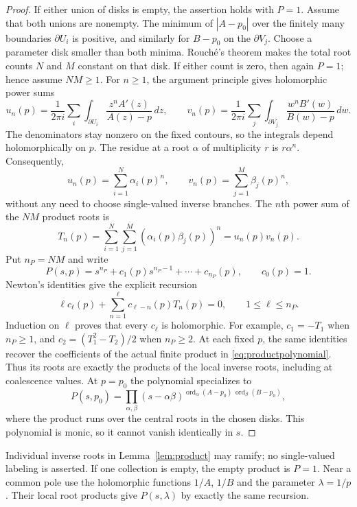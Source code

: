 \documentclass[11pt,reqno]{amsart}
\theoremstyle{remark}
\numberwithin{equation}{section}
\newcommand{\ord}{\operatorname{ord}}
\begin{document}
\begin{proof}
If either union of disks is empty, the assertion holds with $P=1$.
Assume that both unions are nonempty.
The minimum of $|A-p_0|$ over the finitely many boundaries
$\partial U_i$ is positive, and similarly for $B-p_0$ on the
$\partial V_j$. Choose a parameter disk smaller than both minima.
Rouch\'e's theorem makes the total root counts $N$ and $M$ constant
on that disk. If either count is zero, then again $P=1$; hence assume
$NM\ge1$. For $n\ge1$, the argument principle gives holomorphic
power sums
\[
 u_n(p)=\frac{1}{2\pi i}\sum_i
 \int_{\partial U_i}\frac{z^n A'(z)}{A(z)-p}\,dz,
 \qquad
 v_n(p)=\frac{1}{2\pi i}\sum_j
 \int_{\partial V_j}\frac{w^n B'(w)}{B(w)-p}\,dw.
\]
The denominators stay nonzero on the fixed contours, so the
integrals depend holomorphically on $p$. The residue at a root
$\alpha$ of multiplicity $r$ is $r\alpha^n$. Consequently,
\[
 u_n(p)=\sum_{i=1}^N\alpha_i(p)^n,\qquad
 v_n(p)=\sum_{j=1}^M\beta_j(p)^n,
\]
without any need to choose single-valued inverse branches. The
$n$th power sum of the $NM$ product roots is
\[
 T_n(p)=\sum_{i=1}^N\sum_{j=1}^M
          (\alpha_i(p)\beta_j(p))^n=u_n(p)v_n(p).
\]
Put $n_P=NM$ and write
\[
 P(s,p)=s^{n_P}+c_1(p)s^{n_P-1}+\cdots+c_{n_P}(p),\qquad c_0(p)=1.
\]
Newton's identities give the explicit recursion
\begin{equation}\label{eq:newtonrecursion}
 \ell c_\ell(p)+
 \sum_{n=1}^{\ell}c_{\ell-n}(p)T_n(p)=0,
 \qquad 1\le\ell\le n_P.
\end{equation}
Induction on $\ell$ proves that every $c_\ell$ is holomorphic.
For example, $c_1=-T_1$ when $n_P\ge1$, and
$c_2=(T_1^2-T_2)/2$ when $n_P\ge2$.
At each fixed $p$, the same identities recover the coefficients of
the actual finite product in \eqref{eq:productpolynomial}. Thus its
roots are exactly the products of the local inverse roots, including
at coalescence values. At $p=p_0$ the polynomial specializes to
\[
 P(s,p_0)=\prod_{\alpha,\beta}
 (s-\alpha\beta)^{\ord_\alpha(A-p_0)\,\ord_\beta(B-p_0)},
\]
where the product runs over the central roots in the chosen disks.
This polynomial is monic, so it cannot vanish identically in $s$.
\end{proof}

Individual inverse roots in Lemma~\ref{lem:product} may ramify; no
single-valued labeling is asserted. If one collection is empty,
the empty product is $P=1$. Near a common pole use the holomorphic
functions $1/A$, $1/B$ and the parameter $\lambda=1/p$. Their local
root products give $P(s,\lambda)$ by exactly the same recursion.
\end{document}
